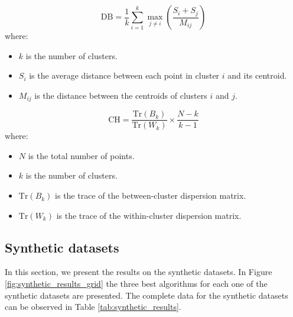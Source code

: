 \documentclass[
	10pt,
	parskip=half-,	
	paper=a4,
	english
	]{scrartcl}
\begin{document}
\begin{equation}
    \text{DB} = \frac{1}{k} \sum_{i=1}^{k} \max_{j \neq i} \left( \frac{S_i + S_j}{M_{ij}} \right)
    \label{eq12}
\end{equation}
where:
\begin{itemize}
    \item $k$ is the number of clusters.
    \item $S_i$ is the average distance between each point in cluster $i$ and its centroid.
    \item $M_{ij}$ is the distance between the centroids of clusters $i$ and $j$.
\end{itemize}

\begin{equation}
    \text{CH} = \frac{\text{Tr}(B_k)}{\text{Tr}(W_k)} \times \frac{N - k}{k-1}
    \label{eq13}
\end{equation}
where:
\begin{itemize}
    \item $N$ is the total number of points.
    \item $k$ is the number of clusters.
    \item $\text{Tr}(B_k)$ is the trace of the between-cluster dispersion matrix.
    \item $\text{Tr}(W_k)$ is the trace of the within-cluster dispersion matrix.
\end{itemize}

\subsection{Synthetic datasets}

In this section, we present the results on the synthetic datasets. In Figure \ref{fig:synthetic_results_grid} the three best algorithms for each one of the synthetic datasets are presented. The complete data for the synthetic datasets can be observed in Table \ref{tab:synthetic_results}. 
\end{document}
